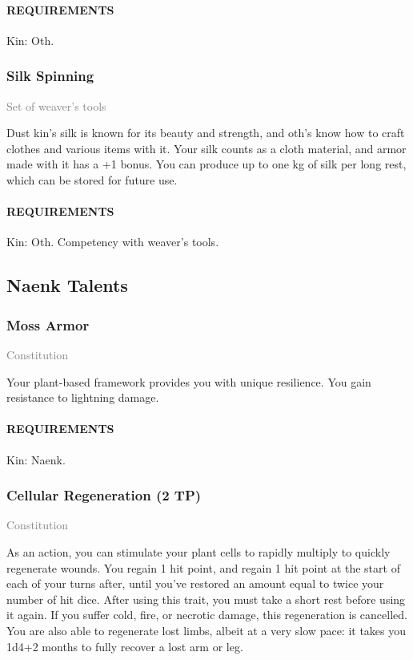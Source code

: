     \paragraph{REQUIREMENTS} Kin: Oth.

    \subsubsection{Silk Spinning} \label{tal::silkspinning}
    \small{\textcolor{gray}{Set of weaver's tools}}

    \normalsize
    Dust kin's silk is known for its beauty and strength, and oth's know how to craft clothes and various items with it.
    Your silk counts as a cloth material, and armor made with it has a +1 bonus.
    You can produce up to one kg of silk per long rest, which can be stored for future use.
    \paragraph{REQUIREMENTS} Kin: Oth. Competency with weaver's tools.

\subsection*{Naenk Talents}
    \subsubsection{Moss Armor} \label{tal::mossarmor}
    \small{\textcolor{gray}{Constitution}}

    \normalsize
    Your plant-based framework provides you with unique resilience.
    You gain resistance to lightning damage.
    \paragraph{REQUIREMENTS} Kin: Naenk.

    \subsubsection{Cellular Regeneration (2 TP)} \label{tal::cellularregeneration}
    \small{\textcolor{gray}{Constitution}}

    \normalsize
    As an action, you can stimulate your plant cells to rapidly multiply to quickly regenerate wounds.
    You regain 1 hit point, and regain 1 hit point at the start of each of your turns after, until you've restored an amount equal to twice your number of hit dice.
    After using this trait, you must take a short rest before using it again.
    If you suffer cold, fire, or necrotic damage, this regeneration is cancelled.
    You are also able to regenerate lost limbs, albeit at a very slow pace: it takes you 1d4+2 months to fully recover a lost arm or leg.
